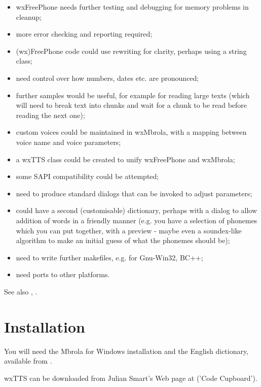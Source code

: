 \begin{itemize}\itemsep=0pt
\item wxFreePhone needs further testing and debugging for memory problems in cleanup;
\item more error checking and reporting required;
\item (wx)FreePhone code could use rewriting for clarity, perhaps using a string class;
\item need control over how numbers, dates etc. are pronounced;
\item further samples would be useful, for example for reading large texts (which will
need to break text into chunks and wait for a chunk to be read before reading the
next one);
\item custom voices could be maintained in wxMbrola, with a mapping between voice name
and voice parameters;
\item a wxTTS class could be created to unify wxFreePhone and wxMbrola;
\item some SAPI compatibility could be attempted;
\item need to produce standard dialogs that can be invoked to adjust parameters;
\item could have a second (customisable) dictionary, perhaps with a dialog to allow addition of
words in a friendly manner (e.g. you have a selection of phonemes which you can
put together, with a preview - maybe even a soundex-like algorithm to make an initial
guess of what the phonemes should be);
\item need to write further makefiles, e.g. for Gnu-Win32, BC++;
\item need ports to other platforms.
\end{itemize}

See also , .

\chapter{Installation}\label{installation}
%
\setfooter{\thepage}{}{}{}{}{\thepage}%

You will need the Mbrola for Windows installation and the English dictionary, available from
 .

wxTTS can be downloaded from Julian Smart's Web page at 
 ('Code Cupboard').

